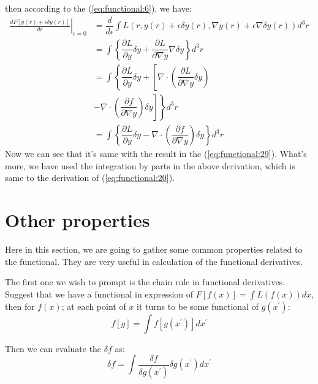 then according to the (\ref{eq:functional:6}), we have:
\begin{equation}
\begin{split}
 \left.\frac{d F[y(r) + \epsilon \delta
y(r)]}{d\epsilon}\right|_{\epsilon=0} &= \dfrac{d}{d\epsilon}\int L(r,
y(r) + \epsilon \delta y(r), \nabla y(r) +
\epsilon\nabla\delta y(r)) d^{3}r \\
&= \int \left\lbrace \dfrac{\partial L}{\partial
y}\delta y + \dfrac{\partial L}{\partial\nabla y}\nabla\delta
y \right\rbrace d^{3}r \\
&=  \int \left\lbrace \dfrac{\partial L}{\partial
y}\delta y + \left[ \nabla \cdot\left( \dfrac{\partial
L}{\partial\nabla y} \delta y\right) \right.\right. \\
&-\left.\left.  \nabla \cdot\left( \dfrac{\partial f}{\partial\nabla
y}\right) \delta y \right]\right\rbrace  d^{3}r \\
&= \int \left\lbrace \dfrac{\partial L}{\partial
y}\delta y - \nabla \cdot\left( \dfrac{\partial
f}{\partial\nabla
y}\right) \delta y \right\rbrace  d^{3}r 
\end{split}
\end{equation}
Now we can see that it's same with the result in the
(\ref{eq:functional:29}). What's more, we have used the integration
by parts in the above derivation, which is same to the derivation
of (\ref{eq:functional:20}).

\section{Other properties}
\label{general_functional_other_properties}
%
%
%
%
Here in this section, we are going to gather some common properties
related to the functional. They are very useful in calculation of the
functional derivatives.

The first one we wish to prompt is the chain rule in functional
derivatives. Suggest that we have a functional in expression of
$F[f(x)] = \int L(f(x))dx$, then for $f(x)$; at each point of $x$ it
turns to be some functional of $g(x^{'})$:
\begin{equation}
 f[g] = \int f[g(x^{'})] dx^{'}
\end{equation}

Then we can evaluate the
$\delta f$ as:
\begin{equation}
  \delta f = \int \frac{\delta f}{\delta g(x^{'})} \delta
g(x^{'}) dx^{'} 
\end{equation}


